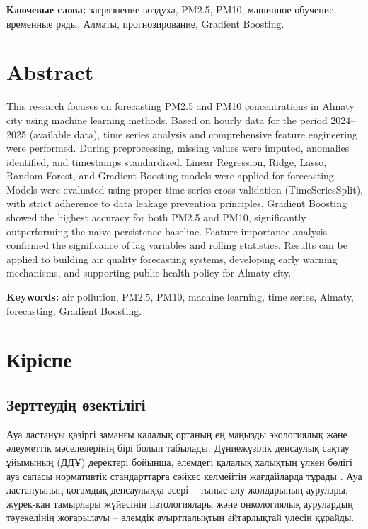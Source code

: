 \documentclass[12pt,a4paper]{article}
\begin{document}
\textbf{Ключевые слова:} загрязнение воздуха, PM2.5, PM10, машинное обучение, временные ряды, Алматы, прогнозирование, Gradient Boosting.

\section*{Abstract}

This research focuses on forecasting PM2.5 and PM10 concentrations in Almaty city using machine learning methods. Based on hourly data for the period 2024–2025 (available data), time series analysis and comprehensive feature engineering were performed. During preprocessing, missing values were imputed, anomalies identified, and timestamps standardized. Linear Regression, Ridge, Lasso, Random Forest, and Gradient Boosting models were applied for forecasting. Models were evaluated using proper time series cross-validation (TimeSeriesSplit), with strict adherence to data leakage prevention principles. Gradient Boosting showed the highest accuracy for both PM2.5 and PM10, significantly outperforming the naive persistence baseline. Feature importance analysis confirmed the significance of lag variables and rolling statistics. Results can be applied to building air quality forecasting systems, developing early warning mechanisms, and supporting public health policy for Almaty city.

\textbf{Keywords:} air pollution, PM2.5, PM10, machine learning, time series, Almaty, forecasting, Gradient Boosting.


\newpage
\tableofcontents
\newpage
\listoffigures
{}
\newpage
\listoftables
{}
\newpage

\section{Кіріспе}

\subsection{Зерттеудің өзектілігі}

Ауа ластануы қазіргі заманғы қалалық ортаның ең маңызды экологиялық және әлеуметтік мәселелерінің бірі болып табылады. Дүниежүзілік денсаулық сақтау ұйымының (ДДҰ) деректері бойынша, әлемдегі қалалық халықтың үлкен бөлігі ауа сапасы нормативтік стандарттарға сәйкес келмейтін жағдайларда тұрады \cite{who2021}. Ауа ластануының қоғамдық денсаулыққа әсері – тыныс алу жолдарының аурулары, жүрек-қан тамырлары жүйесінің патологиялары және онкологиялық аурулардың тәуекелінің жоғарылауы – әлемдік ауыртпалықтың айтарлықтай үлесін құрайды.
\end{document}
